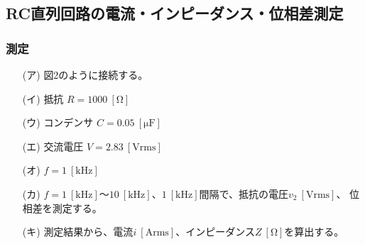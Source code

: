 \documentclass[uplatex]{jsarticle}
\begin{document}
		\subsection{RC直列回路の電流・インピーダンス・位相差測定}
			\subsubsection{測定}
				\begin{enumerate}
					\item[(ア)]{図2のように接続する。}
					\item[(イ)]{抵抗 $R = 1000 \ [\mathrm{\Omega}]$}
					\item[(ウ)]{コンデンサ $C = 0.05 \ [\mathrm{\mu F}]$}
				  	\item[(エ)]{交流電圧 $V = 2.83 \ [\mathrm{Vrms}]$}
					\item[(オ)]{$f = 1 \ [\mathrm{kHz}]$}
					\item[(カ)]{$f = 1 \ [\mathrm{kHz}] ～ 10 \ [\mathrm{kHz}]、1 \ [\mathrm{kHz}]$間隔で、抵抗の電圧$v_{2} \ [\mathrm{Vrms}]$、
					位相差を測定する。}
					\item[(キ)]{測定結果から、電流$i \ [\mathrm{Arms}]$、インピーダンス$Z \ [\mathrm{\Omega}]$を算出する。}
				\end{enumerate}
\end{document}
